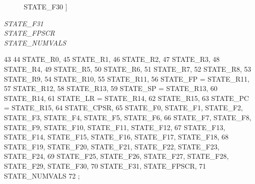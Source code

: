 \begin{Desc}
\begin{description}
{\hypertarget{classTrace_1_1ArmNativeTrace_a2c309f64131cbfdae6d95e6591f208e6a941074d37888eac016ea16818b327f8d}{
STATE\_\-F30}
\label{classTrace_1_1ArmNativeTrace_a2c309f64131cbfdae6d95e6591f208e6a941074d37888eac016ea16818b327f8d}
}]\item[{\em 
\hypertarget{classTrace_1_1ArmNativeTrace_a2c309f64131cbfdae6d95e6591f208e6afaa303f9917b95614e3e95df9928b31e}{
STATE\_\-F31}
\label{classTrace_1_1ArmNativeTrace_a2c309f64131cbfdae6d95e6591f208e6afaa303f9917b95614e3e95df9928b31e}
}]\item[{\em 
\hypertarget{classTrace_1_1ArmNativeTrace_a2c309f64131cbfdae6d95e6591f208e6ad9eb06fbf6c60bac2afcd3966f4401e9}{
STATE\_\-FPSCR}
\label{classTrace_1_1ArmNativeTrace_a2c309f64131cbfdae6d95e6591f208e6ad9eb06fbf6c60bac2afcd3966f4401e9}
}]\item[{\em 
\hypertarget{classTrace_1_1ArmNativeTrace_a2c309f64131cbfdae6d95e6591f208e6acfb033a83d85a60eaca325544f3634c2}{
STATE\_\-NUMVALS}
\label{classTrace_1_1ArmNativeTrace_a2c309f64131cbfdae6d95e6591f208e6acfb033a83d85a60eaca325544f3634c2}
}]\end{description}
\end{Desc}




\begin{DoxyCode}
43                  {
44         STATE_R0,
45         STATE_R1,
46         STATE_R2,
47         STATE_R3,
48         STATE_R4,
49         STATE_R5,
50         STATE_R6,
51         STATE_R7,
52         STATE_R8,
53         STATE_R9,
54         STATE_R10,
55         STATE_R11,
56         STATE_FP = STATE_R11,
57         STATE_R12,
58         STATE_R13,
59         STATE_SP = STATE_R13,
60         STATE_R14,
61         STATE_LR = STATE_R14,
62         STATE_R15,
63         STATE_PC = STATE_R15,
64         STATE_CPSR,
65         STATE_F0, STATE_F1, STATE_F2, STATE_F3, STATE_F4, STATE_F5, STATE_F6,
66         STATE_F7, STATE_F8, STATE_F9, STATE_F10, STATE_F11, STATE_F12,
67         STATE_F13, STATE_F14, STATE_F15, STATE_F16, STATE_F17, STATE_F18,
68         STATE_F19, STATE_F20, STATE_F21, STATE_F22, STATE_F23, STATE_F24,
69         STATE_F25, STATE_F26, STATE_F27, STATE_F28, STATE_F29, STATE_F30,
70         STATE_F31, STATE_FPSCR,
71         STATE_NUMVALS
72     };
\end{DoxyCode}


